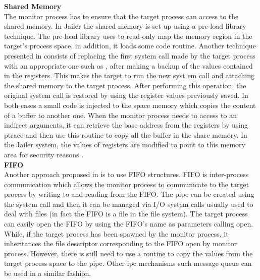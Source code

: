 \textbf{Shared Memory}\\
The monitor process has to ensure that the target process can access to the shared memory. In Jailer \cite{Noordende_asecure} the shared memory is set up using a pre-load library technique. The pre-load library uses  to read-only map the memory region in the target’s process space, in addition, it loads some code routine. Another technique presented in \cite{orchestra} consists of replacing the first system call made by the target process with an appropriate one such as ,  after making a backup of the values contained in the registers. This makes the target to run the new syst em call and attaching the shared memory to the target process. After performing this operation, the original system call is restored by using the register values previously saved.  In both cases a small code is injected to the space memory which copies the content of a buffer to another one. When the monitor process needs to access to an indirect arguments, it can retrieve the base address from the registers by using ptrace and then use this routine to copy all the buffer in the share memory. In the Jailer system, the values of registers are modified to point to this memory area for security reasons  \cite{garfinkel:traps}.\\

\textbf{FIFO}\\
Another approach proposed in \cite{orchestra} is to use FIFO structures.  FIFO is inter-process communication which allows the monitor process to communicate to the target process by writing to and reading from the FIFO.  The pipe can be created using the system call  and then it can be managed via I/O system calls usually used to deal with files (in fact the FIFO is a file in the file system). 
The target process can easily open the FIFO by using the FIFO’s name as parameters calling open.  While, if the target process has been spawned by the monitor process, it inheritances the file descriptor corresponding to the FIFO open by monitor process. However, there is still need to use a routine to copy the values from the target process space to the pipe.  Other ipc mechanisms such message queue \cite{Noordende_asecure} can be used in a similar fashion. \\

